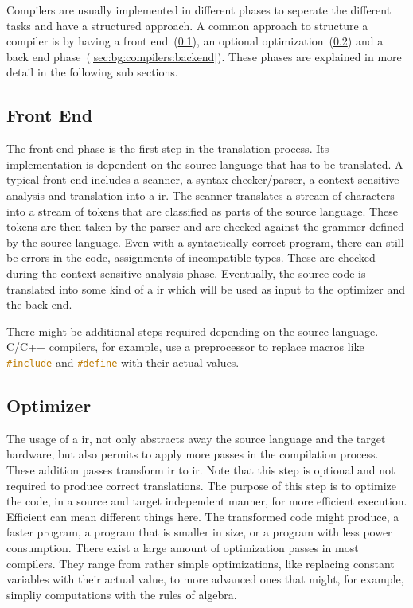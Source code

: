 Compilers are usually implemented in different phases to seperate the different tasks and have a structured approach.
A common approach to structure a compiler is by having a front end~(\cref{sec:bg:compilers:frontend}), an optional optimization~(\cref{sec:bg:compilers:optimizer}) and a back end phase~(\cref{sec:bg:compilers:backend}).
These phases are explained in more detail in the following sub sections.

\subsection{Front End}
\label{sec:bg:compilers:frontend}
The front end phase is the first step in the translation process.
Its implementation is dependent on the source language that has to be translated.
A typical front end includes a scanner, a syntax checker/parser, a context-sensitive analysis and translation into a \ac{ir}.
The scanner translates a stream of characters into a stream of tokens that are classified as parts of the source language.
These tokens are then taken by the parser and are checked against the grammer defined by the source language.
Even with a syntactically correct program, there can still be errors in the code, \eg assignments of incompatible types.
These are checked during the context-sensitive analysis phase.
Eventually, the source code is translated into some kind of a \ac{ir} which will be used as input to the optimizer and the back end.

There might be additional steps required depending on the source language.
C/C++ compilers, for example, use a preprocessor to replace macros like \lstinline[language=C]{#include} and \lstinline[language=C]{#define} with their actual values.

\subsection{Optimizer}
\label{sec:bg:compilers:optimizer}
The usage of a \ac{ir}, not only abstracts away the source language and the target hardware, but also permits to apply more passes in the compilation process.
These addition passes transform \ac{ir} to \ac{ir}.
Note that this step is optional and not required to produce correct translations.
The purpose of this step is to optimize the code, in a source and target independent manner, for more efficient execution.
Efficient can mean different things here. %
The transformed code might produce, \eg a faster program, a program that is smaller in size, or a program with less power consumption.
There exist a large amount of optimization passes in most compilers.
They range from rather simple optimizations, like replacing constant variables with their actual value, to more advanced ones that might, for example, simpliy computations with the rules of algebra.


